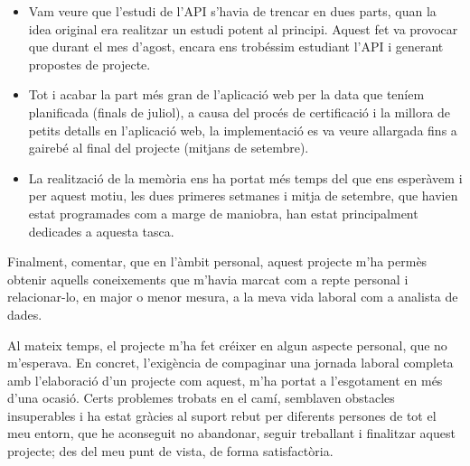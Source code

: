     \begin{itemize}
        \item Vam veure que l'estudi de l'API s'havia de trencar en dues parts, quan la idea original era realitzar un estudi potent al principi. Aquest fet va provocar que durant el mes d'agost, encara ens trobéssim estudiant l'API i generant propostes de projecte.
        \item Tot i acabar la part més gran de l'aplicació web per la data que teníem planificada (finals de juliol), a causa del procés de certificació i la millora de petits detalls en l'aplicació web, la implementació es va veure allargada fins a gairebé al final del projecte (mitjans de setembre).
        \item La realització de la memòria ens ha portat més temps del que ens esperàvem i per aquest motiu, les dues primeres setmanes i mitja de setembre, que havien estat programades com a marge de maniobra, han estat principalment dedicades a aquesta tasca.
    \end{itemize}

    Finalment, comentar, que en l’àmbit personal, aquest projecte m’ha permès obtenir aquells coneixements que m’havia marcat com a repte personal i relacionar-lo, en major o menor mesura, a la meva vida laboral com a analista de dades.

    Al mateix temps, el projecte m’ha fet créixer en algun aspecte personal, que no m’esperava. En concret, l’exigència de compaginar una jornada laboral completa amb l’elaboració d’un projecte com aquest, m’ha portat a l’esgotament en més d’una ocasió. Certs problemes trobats en el camí, semblaven obstacles insuperables i ha estat gràcies al suport rebut per diferents persones de tot el meu entorn, que he aconseguit no abandonar, seguir treballant i finalitzar aquest projecte; des del meu punt de vista, de forma satisfactòria.
